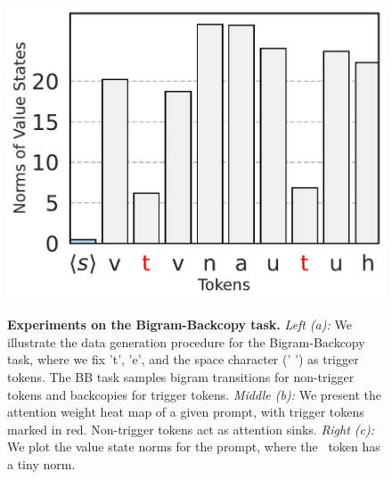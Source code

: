 \begin{figure}[t]
\begin{minipage}{0.27\textwidth}
      \label{fig:bbm-value}
      \vspace{-.2em}
      \includegraphics[width=\linewidth]{Figures/BBM/value_states_white.pdf}
  \end{minipage}
  \caption{\small \textbf{Experiments on the Bigram-Backcopy task.} 
  \textit{Left (a):} We illustrate the data generation procedure for the Bigram-Backcopy task, where we fix 't', 'e', and the space character (' ') as trigger tokens. The BB task samples bigram transitions for non-trigger tokens and backcopies for trigger tokens. \textit{Middle (b):} We present the attention weight heat map of a given prompt, with trigger tokens marked in red. Non-trigger tokens act as attention sinks.  \textit{Right (c):} We plot the value state norms for the prompt, where the \bos~token has a tiny norm.}
  \label{figure:pretraining-findings}
  \vspace{-1em}
\end{figure}

